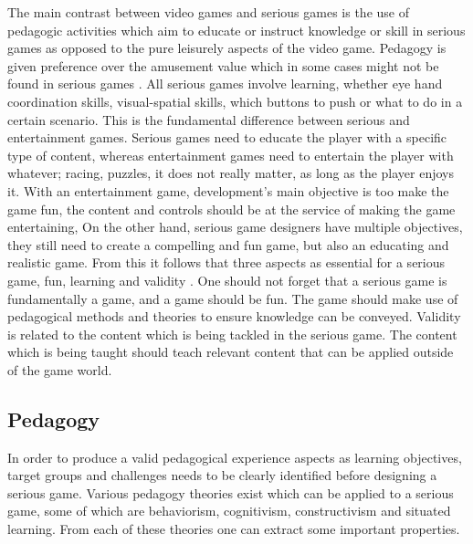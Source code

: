 The main contrast between video games and serious games is the use of pedagogic activities which aim to educate or instruct knowledge or skill \cite{zyda2005visual} in serious games as opposed to the pure leisurely aspects of the video game. Pedagogy is given preference over the amusement value which in some cases might not be found in serious games \cite{zyda2005visual}. All serious games involve learning, whether eye hand coordination skills, visual-spatial skills,  which buttons to push or what to do in a certain scenario. This is the fundamental difference between serious and entertainment games. Serious games need to educate the player with a specific type of content, whereas entertainment games need to entertain the player with whatever; racing, puzzles, it does not really matter, as long as the player enjoys it\cite{Harteveld2007}. With an entertainment game, development's main objective is too make the game fun, the content and controls should be at the service of making the game entertaining, On the other hand, serious game designers have multiple objectives, they still need to create a compelling and fun game, but also an educating and realistic game.  From this it follows that three aspects as essential for a serious game, fun, learning and validity \cite{Harteveld2007}. One should not forget that a serious game is fundamentally a game, and a game should be fun. The game should make use of pedagogical methods and theories to ensure knowledge can be conveyed. Validity is related to the content which is being tackled in the serious game. The content which is being taught should teach relevant content that can be applied outside of the game world.

\subsection{Pedagogy}
In order to produce a valid pedagogical experience aspects as learning objectives, target groups and challenges needs to be clearly identified before designing a serious game\cite{moser2002methodology}. Various pedagogy theories exist which can be applied to a serious game, some of which are behaviorism, cognitivism, constructivism and situated learning\cite{egenfeldt2005beyond}. From each of these theories one can extract some important properties. 


